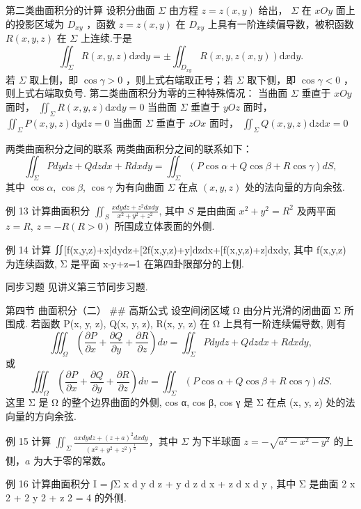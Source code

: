 第二类曲面积分的计算
设积分曲面 \(\Sigma\) 由方程 \(z = z(x,y)\) 给出， \(\Sigma\) 在 \(xOy\) 面上的投影区域为 \(D_{xy}\) ，函数 \(z = z(x,y)\) 在 \(D_{xy}\) 上具有一阶连续偏导数，被积函数 \(R(x,y,z)\) 在 \(\Sigma\) 上连续.于是
\[\iint_{\Sigma}R(x,y,z)\mathrm{d}x\mathrm{d}y = \pm \iint_{D_{xy}}R(x,y,z(x,y))\mathrm{d}x\mathrm{d}y.\]
若 \(\Sigma\) 取上侧，即 \(\cos \gamma >0\) ，则上式右端取正号；若 \(\Sigma\) 取下侧，即 \(\cos \gamma < 0\) ，则上式右端取负号.
第二类曲面积分为零的三种特殊情况：
当曲面 \(\Sigma\) 垂直于 \(xOy\) 面时， \(\iint_{\Sigma}R(x,y,z)\mathrm{d}x\mathrm{d}y = 0\) 当曲面 \(\Sigma\) 垂直于 \(yOz\) 面时， \(\iint_{\Sigma}P(x,y,z)\mathrm{d}y\mathrm{d}z = 0\) 当曲面 \(\Sigma\) 垂直于 \(zOx\) 面时， \(\iint_{\Sigma}Q(x,y,z)\mathrm{d}z\mathrm{d}x = 0\)

两类曲面积分之间的联系 两类曲面积分之间的联系如下：
\[ \iint_{\Sigma} Pdy dz + Qdz dx + Rdx dy = \iint_{\Sigma} (P \cos \alpha + Q \cos \beta + R \cos \gamma) dS, \]
其中 \(\cos \alpha\), \(\cos \beta\), \(\cos \gamma\) 为有向曲面 \(\Sigma\) 在点 \((x, y, z)\) 处的法向量的方向余弦.

例 13
计算曲面积分 \(\iint_S \frac{x dy dz + z^2 dx dy}{x^2 + y^2 + z^2}\), 其中 \(S\) 是由曲面 \(x^2 + y^2 = R^2\) 及两平面 \(z = R\), \(z = -R(R > 0)\) 所围成立体表面的外侧.

例 14
计算
∬[f(x,y,z)+x]dydz+[2f(x,y,z)+y]dzdx+[f(x,y,z)+z]dxdy, 其中 f(x,y,z) 为连续函数, Σ 是平面 x-y+z=1 在第四卦限部分的上侧.

同步习题 见讲义第三节同步习题.

第四节 曲面积分（二）
## 高斯公式
设空间闭区域 Ω 由分片光滑的闭曲面 Σ 所围成. 若函数 P(x, y, z), Q(x, y, z), R(x, y, z) 在 Ω 上具有一阶连续偏导数, 则有
\[ \iiint_{\Omega} \left( \frac{\partial P}{\partial x} + \frac{\partial Q}{\partial y} + \frac{\partial R}{\partial z} \right) dv = \iint_{\Sigma} P dy dz + Q dz dx + R dx dy, \]
或
\[ \iiint_{\Omega} \left( \frac{\partial P}{\partial x} + \frac{\partial Q}{\partial y} + \frac{\partial R}{\partial z} \right) dv = \iint_{\Sigma} (P \cos \alpha + Q \cos \beta + R \cos \gamma) dS. \]
这里 Σ 是 Ω 的整个边界曲面的外侧, cos α, cos β, cos γ 是 Σ 在点 (x, y, z) 处的法向量的方向余弦.

例 15
计算 \(\iint_{\Sigma} \frac{axdy dz + (z+a)^2 dxdy}{(x^2 + y^2 + z^2)^{\frac{1}{2}}}\)，其中 \(\Sigma\) 为下半球面 \(z = -\sqrt{a^2 - x^2 - y^2}\) 的上侧，\(a\) 为大于零的常数。

例 16
计算曲面积分 I = ∫Σ x d y d z + y d z d x + z d x d y , 其中 Σ 是曲面 2 x 2 + 2 y 2 + z 2 = 4 的外侧.

